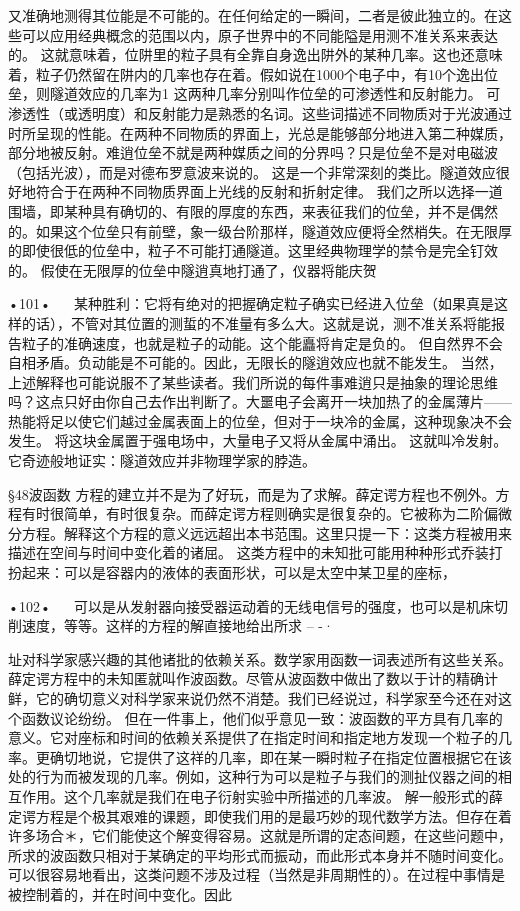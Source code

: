 又准确地测得其位能是不可能的。在任何给定的一瞬间，二者是彼此独立的。在这些可以应用经典概念的范围以内，原子世界中的不同能隘是用测不准关系来表达的。
这就意味着，位阱里的粒子具有全靠自身逸出阱外的某种几率。这也还意味着，粒子仍然留在阱内的几率也存在着。假如说在1000个电子中，有10个逸出位垒，则隧道效应的几率为1%
这两种几率分别叫作位垒的可渗透性和反射能力。
可渗透性（或透明度）和反射能力是熟悉的名词。这些词描述不同物质对于光波通过时所呈现的性能。在两种不同物质的界面上，光总是能够部分地进入第二种媒质，部分地被反射。难逍位垒不就是两种媒质之间的分界吗？只是位垒不是对电磁波（包括光波），而是对德布罗意波来说的。
这是一个非常深刻的类比。隧道效应很好地符合于在两种不同物质界面上光线的反射和折射定律。
我们之所以选择一道围墙，即某种具有确切的、有限的厚度的东西，来表征我们的位垒，并不是偶然的。如果这个位垒只有前壁，象一级台阶那样，隧道效应便将全然梢失。在无限厚的即使很低的位垒中，粒子不可能打通隧道。这里经典物理学的禁令是完全钉效的。
假使在无限厚的位垒中隧逍真地打通了，仪器将能庆贺

•101•
  
某种胜利：它将有绝对的把握确定粒子确实已经进入位垒（如果真是这样的话），不管对其位置的测蜇的不准量有多么大。这就是说，测不准关系将能报告粒子的准确速度，也就是粒子的动能。这个能矗将肯定是负的。
但自然界不会自相矛盾。负动能是不可能的。因此，无限长的隧逍效应也就不能发生。
当然，上述解释也可能说服不了某些读者。我们所说的每件事难逍只是抽象的理论思维吗？这点只好由你自己去作出判断了。大噩电子会离开一块加热了的金属薄片——热能将足以使它们越过金属表面上的位垒，但对于一块冷的金属，这种现象决不会发生。
将这块金属置于强电场中，大量电子又将从金属中涌出。
这就叫冷发射。它奇迹般地证实：隧道效应并非物理学家的脖造。

§48波函数
方程的建立并不是为了好玩，而是为了求解。薛定谔方程也不例外。方程有时很简单，有时很复杂。而薛定谔方程则确实是很复杂的。它被称为二阶偏微分方程。解释这个方程的意义远远超出本书范围。这里只提一下：这类方程被用来描述在空间与时间中变化着的诸屈。
这类方程中的未知批可能用种种形式乔装打扮起来：可以是容器内的液体的表面形状，可以是太空中某卫星的座标，

•102•
  
可以是从发射器向接受器运动着的无线电信号的强度，也可以是机床切削速度，等等。这样的方程的解直接地给出所求
	--	-·

址对科学家感兴趣的其他诸批的依赖关系。数学家用函数一词表述所有这些关系。
薛定谔方程中的未知匿就叫作波函数。尽管从波函数中做出了数以于计的精确计鲜，它的确切意义对科学家来说仍然不消楚。我们已经说过，科学家至今还在对这个函数议论纷纷。
但在一件事上，他们似乎意见一致：波函数的平方具有几率的意义。它对座标和时间的依赖关系提供了在指定时间和指定地方发现一个粒子的几率。更确切地说，它提供了这祥的几率，即在某一瞬时粒子在指定位置根据它在该处的行为而被发现的几率。例如，这种行为可以是粒子与我们的测扯仪器之间的相互作用。这个几率就是我们在电子衍射实验中所描述的几率波。
解一般形式的薛定谔方程是个极其艰难的课题，即使我们用的是最巧妙的现代数学方法。但存在着许多场合＊，它们能使这个解变得容易。这就是所谓的定态间题，在这些问题中，所求的波函数只相对于某确定的平均形式而振动，而此形式本身并不随时间变化。
可以很容易地看出，这类问题不涉及过程（当然是非周期性的）。在过程中事情是被控制着的，并在时间中变化。因此

